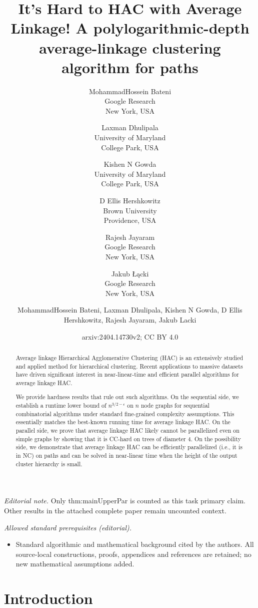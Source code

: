 \documentclass[11pt]{article}
\title{
It's Hard to HAC with Average Linkage!
}
\author{%
MohammadHossein Bateni\\%
Google Research\\%
New York, USA%
\and%
Laxman Dhulipala\\%
University of Maryland\\%
College Park, USA%
\and%
Kishen N Gowda\\%
University of Maryland\\
College Park, USA%
\and%
D Ellis Hershkowitz\\%
Brown University\\
Providence, USA%
\and%
Rajesh Jayaram\\%
Google Research\\
New York, USA%
\and%
Jakub Łącki\\%
Google Research\\
New York, USA%
}
\date{}
\title{A polylogarithmic-depth average-linkage clustering algorithm for paths}
\author{MohammadHossein Bateni, Laxman Dhulipala, Kishen N Gowda, D Ellis Hershkowitz, Rajesh Jayaram, Jakub Lacki}
\date{arxiv:2404.14730v2; CC BY 4.0}
\begin{document}
\maketitle
\noindent\textit{Editorial note.} Only thm:mainUpperPar is counted as this task primary claim. Other results in the attached complete paper remain uncounted context.\par\medskip
\noindent\textit{Allowed standard prerequisites (editorial).}\begin{itemize}
\item Standard algorithmic and mathematical background cited by the authors. All source-local constructions, proofs, appendices and references are retained; no new mathematical assumptions added.
\end{itemize}\medskip

\begin{abstract}
Average linkage Hierarchical Agglomerative Clustering (HAC) is an extensively studied and applied method for hierarchical clustering. Recent applications to massive datasets have driven significant interest in near-linear-time and efficient parallel algorithms for average linkage HAC.

We provide hardness results that rule out such algorithms. On the sequential side, we establish a runtime lower bound of $n^{3/2-\epsilon}$ on $n$ node graphs for sequential combinatorial algorithms under standard fine-grained complexity assumptions. This essentially matches the best-known running time for average linkage HAC. On the parallel side, we prove that average linkage HAC likely cannot be parallelized even on simple graphs by showing that it is CC-hard on trees of diameter $4$. On the possibility side, we demonstrate that average linkage HAC can be efficiently parallelized (i.e., it is in NC) on paths and can be solved in near-linear time when the height of the output cluster hierarchy is small.
\end{abstract}
\thispagestyle{empty}
\newpage
\setcounter{page}{1}

\section{Introduction}
\end{document}
